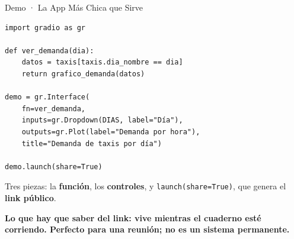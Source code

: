 \documentclass[aspectratio=169, 11pt]{beamer}
\begin{document}
\begin{frame}[fragile, shrink=8]{Demo · La App Más Chica que Sirve}
  \vspace{2pt}
  \begin{verbatim}
import gradio as gr

def ver_demanda(dia):
    datos = taxis[taxis.dia_nombre == dia]
    return grafico_demanda(datos)

demo = gr.Interface(
    fn=ver_demanda,
    inputs=gr.Dropdown(DIAS, label="Día"),
    outputs=gr.Plot(label="Demanda por hora"),
    title="Demanda de taxis por día")

demo.launch(share=True)
  \end{verbatim}
  \vspace{4pt}
  {\footnotesize\color{textMuted}
   Tres piezas: la \textbf{función}, los \textbf{controles}, y
   \texttt{launch(share=True)}, que genera el \textbf{link público}.}
  \vspace{4pt}

  {\scriptsize\color{arcaDark}\bfseries
   Lo que hay que saber del link: vive mientras el cuaderno esté corriendo.
   Perfecto para una reunión; no es un sistema permanente.}
\end{frame}
\end{document}
